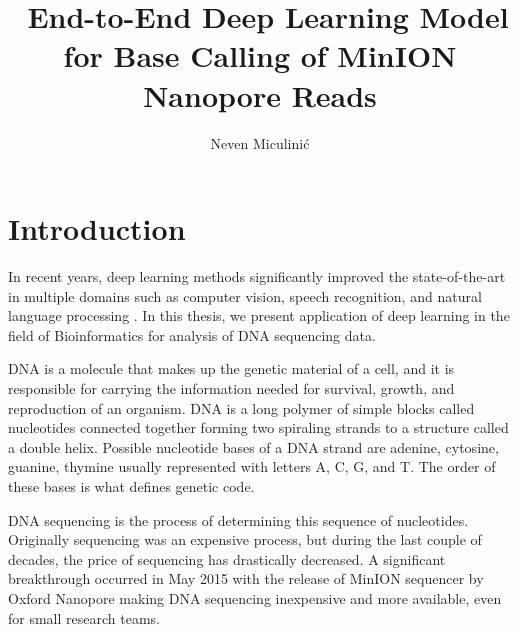 \documentclass[times, utf8, diplomski, english]{fer}
\begin{document}
\title{ End-to-End Deep Learning Model for Base Calling of MinION Nanopore Reads}
\author{Neven Miculinić}
\maketitle
 
\izvornik


\tableofcontents
\listoffigures
\listoftables

\chapter{Introduction}
\label{chap:Introduction}

In recent years,  deep learning methods significantly improved the state-of-the-art in multiple domains such as computer vision, speech recognition, and natural language processing \cite{LeCun:1998:CNI:303568.303704}\cite{NIPS2012_4824}. 
In this thesis, we present application of deep learning in the field of  Bioinformatics for analysis of DNA sequencing data. 

DNA is a molecule that makes up the genetic material of a cell, and it is responsible for carrying the information needed for survival, growth, and reproduction of an organism. 
DNA is a long polymer of simple blocks called nucleotides connected together forming two spiraling strands to a structure called a double helix.  Possible nucleotide bases of a DNA strand are adenine, cytosine, guanine, thymine usually represented with letters A, C, G, and T. The order of these bases is what defines genetic code.

DNA sequencing is the process of determining this sequence of nucleotides. Originally sequencing was an expensive process, but during the last couple of decades, the price of sequencing has drastically decreased.  A significant breakthrough occurred in May 2015 with the release of MinION sequencer by Oxford Nanopore making DNA sequencing inexpensive and more available, even for small research teams. 
\end{document}
